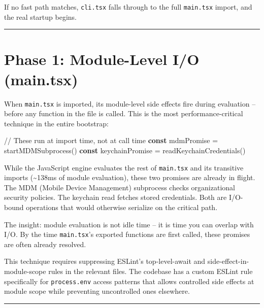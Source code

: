 \documentclass[
  english,
  11pt,
  letterpaper,
]{book}
\newenvironment{Shaded}{\begin{snugshade}}{\end{snugshade}}
\newcommand{\CommentTok}[1]{\textcolor[rgb]{0.37,0.37,0.37}{#1}}
\newcommand{\FunctionTok}[1]{\textcolor[rgb]{0.28,0.35,0.67}{#1}}
\newcommand{\KeywordTok}[1]{\textcolor[rgb]{0.00,0.23,0.31}{\textbf{#1}}}
\newcommand{\NormalTok}[1]{\textcolor[rgb]{0.00,0.23,0.31}{#1}}
\newcommand{\OperatorTok}[1]{\textcolor[rgb]{0.37,0.37,0.37}{#1}}
\begin{document}
If no fast path matches, \texttt{cli.tsx} falls through to the full
\texttt{main.tsx} import, and the real startup begins.

\begin{center}\rule{0.5\linewidth}{0.5pt}\end{center}

\section{Phase 1: Module-Level I/O
(main.tsx)}\label{phase-1-module-level-io-main.tsx}

When \texttt{main.tsx} is imported, its module-level side effects fire
during evaluation -- before any function in the file is called. This is
the most performance-critical technique in the entire bootstrap:

\begin{Shaded}
\begin{Highlighting}[]
\CommentTok{// These run at import time, not at call time}
\KeywordTok{const}\NormalTok{ mdmPromise }\OperatorTok{=} \FunctionTok{startMDMSubprocess}\NormalTok{()}
\KeywordTok{const}\NormalTok{ keychainPromise }\OperatorTok{=} \FunctionTok{readKeychainCredentials}\NormalTok{()}
\end{Highlighting}
\end{Shaded}

While the JavaScript engine evaluates the rest of \texttt{main.tsx} and
its transitive imports (\textasciitilde138ms of module evaluation),
these two promises are already in flight. The MDM (Mobile Device
Management) subprocess checks organizational security policies. The
keychain read fetches stored credentials. Both are I/O-bound operations
that would otherwise serialize on the critical path.

The insight: module evaluation is not idle time -- it is time you can
overlap with I/O. By the time \texttt{main.tsx}'s exported functions are
first called, these promises are often already resolved.

This technique requires suppressing ESLint's top-level-await and
side-effect-in-module-scope rules in the relevant files. The codebase
has a custom ESLint rule specifically for \texttt{process.env} access
patterns that allows controlled side effects at module scope while
preventing uncontrolled ones elsewhere.

\begin{center}\rule{0.5\linewidth}{0.5pt}\end{center}
\end{document}
